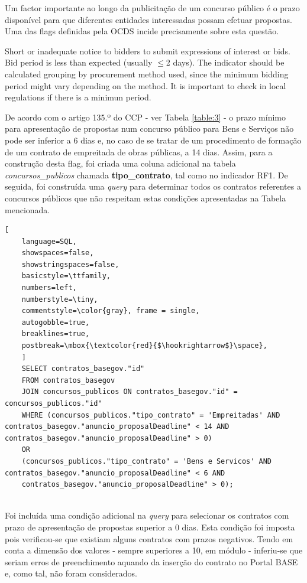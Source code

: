 Um factor importante ao longo da publicitação de um concurso público é o prazo disponível para que diferentes entidades interessadas possam efetuar propostas. Uma das flags definidas pela OCDS incide precisamente sobre esta questão.

{Short or inadequate notice to bidders to submit expressions of interest or bids. Bid period is less than expected (usually $\leq$2 days). The indicator should be calculated grouping by procurement method used, since the minimum bidding period might vary depending on the method.  It is important to check in local regulations if there is a minimun period.}


De acordo com o artigo 135.º do CCP - ver Tabela \ref{table:3} - o prazo mínimo para apresentação de propostas num concurso público para Bens e Serviços não pode ser inferior a 6 dias e, no caso de se tratar de um procedimento de formação de um contrato de empreitada de obras públicas, a 14 dias. Assim, para a construção desta flag, foi criada uma coluna adicional na tabela \textit{concursos\_publicos} chamada \textbf{tipo\_contrato}, tal como no indicador RF1. De seguida, foi construída uma \textit{query} para determinar todos os contratos referentes a concursos públicos que não respeitam estas condições apresentadas na Tabela mencionada. \\


\begin{lstlisting}[
	language=SQL,
	showspaces=false,
	showstringspaces=false,
	basicstyle=\ttfamily,
	numbers=left,
	numberstyle=\tiny,
	commentstyle=\color{gray}, frame = single,
	autogobble=true,
	breaklines=true,
	postbreak=\mbox{\textcolor{red}{$\hookrightarrow$}\space},
	]
	SELECT contratos_basegov."id" 
	FROM contratos_basegov
	JOIN concursos_publicos ON contratos_basegov."id" = concursos_publicos."id"
	WHERE (concursos_publicos."tipo_contrato" = 'Empreitadas' AND contratos_basegov."anuncio_proposalDeadline" < 14 AND contratos_basegov."anuncio_proposalDeadline" > 0) 
	OR
	(concursos_publicos."tipo_contrato" = 'Bens e Servicos' AND contratos_basegov."anuncio_proposalDeadline" < 6 AND
	contratos_basegov."anuncio_proposalDeadline" > 0);
	
\end{lstlisting}


Foi incluída uma condição adicional na \textit{query} para selecionar os contratos com prazo de apresentação de propostas superior a 0 dias. Esta condição foi imposta pois verificou-se que existiam alguns contratos com prazos negativos. Tendo em conta a dimensão dos valores - sempre superiores a 10, em módulo - inferiu-se que seriam erros de preenchimento aquando da inserção do contrato no Portal BASE e, como tal, não foram considerados. 

